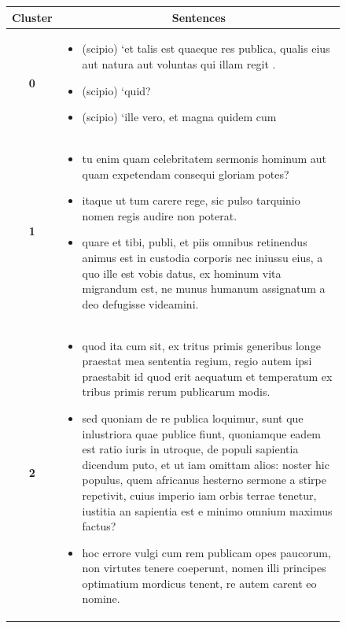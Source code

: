 \documentclass[a4paper, 12pt,notitlepage]{article} %
\newenvironment{figurecenter}{%
	\setlength\topsep{-7pt}
	\setlength\parskip{-7pt}
	\singlespacing %
	\begin{center}
	}{%
	\end{center}
\vspace{-5pt}
}
\numberwithin{dummy}{subsection}
\numberwithin{dummy}{section}
\theoremstyle{named}
\theoremstyle{definition}
\theoremstyle{definition}
\begin{document}
\begin{figure}[H]
	\begin{figurecenter}
		\small
			\begin{tabular}{|c|m{14cm}|}
				\hline
				\textbf{Cluster} & \multicolumn{1}{|c|}{\textbf{Sentences}}   \\ \hline
				 {\textbf{0}} &  \begin{itemize}[leftmargin=*] \vspace{-0.3cm} \itemsep -0.15cm \item (scipio) `et talis est quaeque res publica, qualis eius aut natura aut voluntas qui illam regit \cite[I.4]{drp}. \item (scipio) `quid? \cite[I.61]{drp} \item (scipio) `ille vero, et magna quidem cum \cite[I.23]{drp} \vspace{-0.4cm} \end{itemize}  \\ 
				 \hline
				{\textbf{1}} &  \begin{itemize}[leftmargin=*] \vspace{-0.3cm} \itemsep -0.15cm \item tu enim quam celebritatem sermonis hominum aut quam expetendam consequi gloriam potes? \cite[VI.20]{drp} \item itaque ut tum carere rege, sic pulso tarquinio nomen regis audire non poterat. \cite[II.52]{drp} \item quare et tibi, publi, et piis omnibus retinendus animus est in custodia corporis nec iniussu eius, a quo ille est vobis datus, ex hominum vita migrandum est, ne munus humanum assignatum a deo defugisse videamini. \cite[VI.15]{drp} \vspace{-0.4cm} \end{itemize}  \\ 
				\hline
				{\textbf{2}} &  \begin{itemize}[leftmargin=*] \vspace{-0.3cm} \itemsep -0.15cm \item quod ita cum sit, ex tritus primis generibus longe praestat mea sententia regium, regio autem ipsi praestabit id quod erit aequatum et temperatum ex tribus primis rerum publicarum modis. \cite[I.69]{drp} \item sed quoniam de re publica loquimur, sunt que inlustriora quae publice fiunt, quoniamque eadem est ratio iuris in utroque, de populi sapientia dicendum puto, et ut iam omittam alios: noster hic populus, quem africanus hesterno sermone a stirpe repetivit, cuius imperio iam orbis terrae tenetur, iustitia an sapientia est e minimo omnium maximus factus? \cite[III.24]{drp} \item hoc errore vulgi cum rem publicam opes paucorum, non virtutes tenere coeperunt, nomen illi principes optimatium mordicus tenent, re autem carent eo nomine. \cite[I.51]{drp} \vspace{-0.4cm} \end{itemize}  \\ 

\end{tabular}
\end{figurecenter}
\end{figure}
\end{document}
